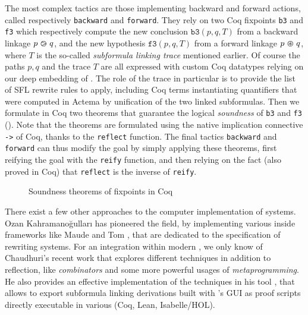 The most complex tactics are those implementing backward and forward 
actions, called respectively \texttt{backward} and \texttt{forward}. They rely
on two Coq fixpoints \texttt{b3} and \texttt{f3} which respectively compute the
new conclusion $\mathtt{b3}(p, q, T)$ from a backward linkage $p \operatorname{\,\varogreaterthan\,} q$, and
the new hypothesis $\mathtt{f3}(p, q, T)$ from a forward linkage $p \operatorname{\,\varoast\,} q$,
where $T$ is the so-called \emph{subformula linking trace} mentioned earlier. Of
course the paths $p, q$ and the trace $T$ are all expressed with custom Coq
datatypes relying on our deep embedding of . The role of the
trace in particular is to provide the list of SFL rewrite rules to apply,
including Coq terms instantiating quantifiers that were computed in Actema by
unification of the two linked subformulas. Then we formulate in Coq two theorems
that guarantee the logical \emph{soundness} of \texttt{b3} and \texttt{f3}
(). Note that the theorems are formulated using the native
implication connective \texttt{->} of Coq, thanks to the \texttt{reflect}
function. The final tactics \texttt{backward} and \texttt{forward} can thus
modify the goal by simply applying these theorems, first reifying the goal with
the \texttt{reify} function, and then relying on the fact (also proved in Coq)
that \texttt{reflect} is the inverse of \texttt{reify}.

\begin{figure}
  
  \caption{Soundness theorems of  fixpoints in Coq}
\end{figure}


\begin{remark}
  There exist a few other approaches to the computer implementation of  systems. Ozan Kahramanoğulları has pioneered the field, by
  implementing various  inside frameworks like Maude
  \cite{kahramanogullari_maude_2008} and Tom
  \cite{kahramanogullari_implementing_2005}, that are dedicated to the
  specification of rewriting systems. For an integration within modern , we only know of Chaudhuri's recent work
   that explores different techniques in
  addition to reflection, like \emph{combinators} and some more powerful usages
  of \emph{metaprogramming}. He also provides an effective implementation of the
  techniques in his  tool \cite{DBLP:conf/cade/Chaudhuri21}, that
  allows to export subformula linking derivations built with 's GUI
  as proof scripts directly executable in various  (Coq, Lean,
  Isabelle/HOL).
\end{remark}


